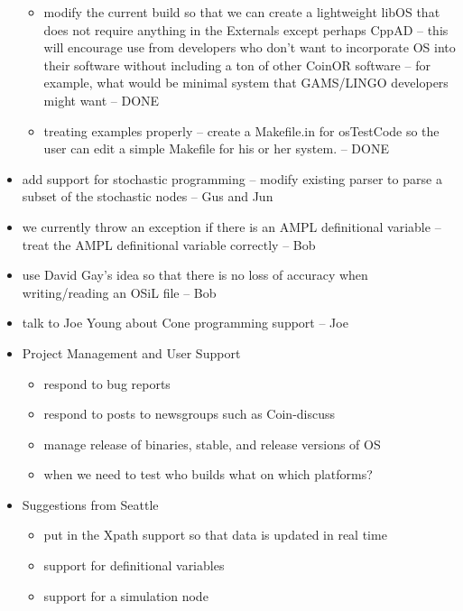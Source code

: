 \documentclass[11pt]{article}
\begin{document}
\begin{itemize}
\begin{itemize}
\item modify the current build so that we can create a lightweight libOS that does not require anything in the Externals except perhaps CppAD -- this will encourage use from developers who don't want to incorporate OS into their software without including a ton of other CoinOR software -- for example, what would be minimal system that GAMS/LINGO developers might want  -- DONE

\item treating examples properly -- create  a Makefile.in for osTestCode so the user can edit a simple Makefile for his or her system.  -- DONE

\end{itemize}
\item  add support for stochastic programming --  modify existing parser to parse a subset of the stochastic nodes  -- Gus and Jun

\item we currently throw an exception if there is an AMPL definitional variable -- treat the AMPL definitional variable correctly  -- Bob

\item use David Gay's idea so that there is no loss of accuracy when writing/reading an OSiL  file  -- Bob


\item talk to Joe Young about Cone programming support -- Joe



\item Project Management and User Support

\begin{itemize}

\item respond to bug reports

\item respond to posts to newsgroups such as Coin-discuss

\item manage release of binaries, stable, and release versions of OS

\item when we need to test who builds what on which platforms?

\end{itemize}




\item Suggestions from Seattle

\begin{itemize}
\item put in the Xpath support so that data is updated in real time

\item support for definitional variables

\item support for a simulation node
\end{itemize}








\end{itemize}
\end{document}
